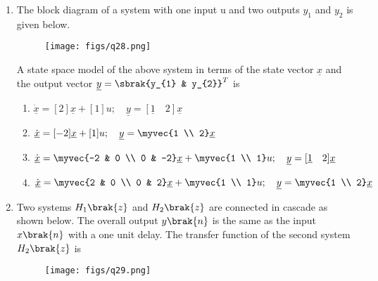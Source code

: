 \documentclass[a4paper, 11pt]{article}
\begin{document}
\begin{enumerate}
    \item The block diagram of a system with one input u and two outputs $y_{1}$ and $y_{2}$ is given below.
    
    \begin{figure}[H]
        \centering
        \texttt{[image: figs/q28.png]}
        \caption*{}
        \label{fig:q28}
    \end{figure}
    
    A state space model of the above system in terms of the state vector $\underline{x}$ and the output vector $\underline{y}=\sbrak{y_{1} & y_{2}}^{T}$ is
    
    \begin{enumerate}
        \item $\dot{\underline{x}}=[2]\underline{x}+[1]u; \quad \underline{y}=[\underline{1} \quad 2]\underline{x}$
        \item $\dot{\underline{x}}=[-2]\underline{x}+[1]u; \quad \underline{y}=\myvec{1 \\ 2}\underline{x}$
        \item $\dot{\underline{x}}=\myvec{-2 & 0 \\ 0 & -2}\underline{x}+\myvec{1 \\ 1}u; \quad \underline{y}=[\underline{1} \quad 2]\underline{x}$
        \item $\dot{\underline{x}}=\myvec{2 & 0 \\ 0 & 2}\underline{x}+\myvec{1 \\ 1}u; \quad \underline{y}=\myvec{1 \\ 2}\underline{x}$
    \end{enumerate}

    \hfill{}

    \item Two systems $H_{1}\brak{z}$ and $H_{2}\brak{z}$ are connected in cascade as shown below. The overall output $y\brak{n}$ is the same as the input $x\brak{n}$ with a one unit delay. The transfer function of the second system $H_{2}\brak{z}$ is
    
    \begin{figure}[H]
        \centering
        \texttt{[image: figs/q29.png]}
        \caption*{}
        \label{fig:q29}
    \end{figure}
    
    \begin{enumerate}
    \end{enumerate}
    

\end{enumerate}
\end{document}
